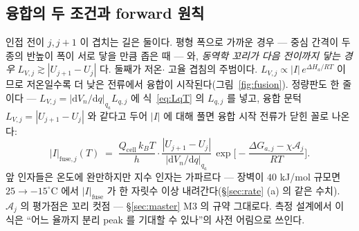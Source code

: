\documentclass[11pt,a4paper]{article}
\newcommand{\dd}{\mathrm{d}}
\newcommand{\cell}{\mathrm{cell}}
\begin{document}
\subsection{융합의 두 조건과 forward 원칙}
인접 전이 $j,j{+}1$ 이 겹치는 길은 둘이다. 평형 폭으로 가까운 경우 — 중심 간격이 두 종의 반높이 폭이
서로 닿을 만큼 좁은 때 — 와, \emph{동역학 꼬리가 다음 전이까지 닿는 경우}
$L_{V,j}\gtrsim|U_{j+1}-U_j|$ 다. 둘째가 저온$\cdot$
고율 겹침의 주범이다. $L_{V,j}\propto|I|\,e^{\Delta H_a/RT}$ 이므로 저온일수록 더 낮은 전류에서 융합이
시작된다(그림~\ref{fig:fusion}). 정량판도 한 줄이다 — $L_{V,j}=|\dd V_n/\dd q|_{q_a}L_{q,j}$ 에
식~\eqref{eq:LqT} 의 $L_{q,j}$ 를 넣고, 융합 문턱 $L_{V,j}=|U_{j+1}-U_j|$ 와 같다고 두어 $|I|$ 에
대해 풀면 융합 시작 전류가 닫힌 꼴로 나온다:
\begin{equation}
|I|_{\text{fuse},j}(T)\;=\;\frac{Q_\cell\,k_BT}{h}\cdot
\frac{|U_{j+1}-U_j|}{|\dd V_n/\dd q|_{q_a}}\,
\exp\!\Big[-\frac{\Delta G_{a,j}-\chi\mathcal A_j}{RT}\Big].
\label{eq:Ifuse}
\end{equation}
앞 인자들은 온도에 완만하지만 지수 인자는 가파르다 — 장벽이 $40$ kJ/mol 규모면 $25\to-15^\circ$C
에서 $|I|_{\text{fuse}}$ 가 한 자릿수 이상 내려간다(\S\ref{sec:rate} (a) 의 같은 수치). $\mathcal A_j$ 의
평가점은 꼬리 컷점 — \S\ref{sec:master} M3 의 규약 그대로다. 측정 설계에서 이 식은 ``어느 율까지
분리 peak 를 기대할 수 있나''의 사전 어림으로 쓰인다.
\end{document}
